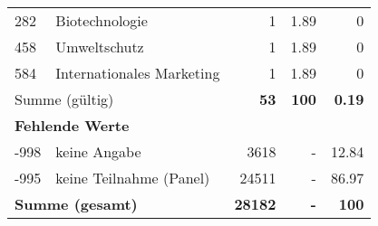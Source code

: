 \begin{longtable}{lXrrr}
        282 & \multicolumn{1}{X}{Biotechnologie} & %
          \num{1} &
          \num[round-mode=places,round-precision=2]{1.89} &
          \num[round-mode=places,round-precision=2]{0} \\

        458 & \multicolumn{1}{X}{Umweltschutz} & %
          \num{1} &
          \num[round-mode=places,round-precision=2]{1.89} &
          \num[round-mode=places,round-precision=2]{0} \\

        584 & \multicolumn{1}{X}{Internationales Marketing} & %
          \num{1} &
          \num[round-mode=places,round-precision=2]{1.89} &
          \num[round-mode=places,round-precision=2]{0} \\

     \midrule
     \multicolumn{2}{l}{Summe (gültig)} &
       \textbf{\num{53}} &
     \textbf{\num{100}} &
       \textbf{\num[round-mode=places,round-precision=2]{0.19}} \\
     \multicolumn{5}{l}{\textbf{Fehlende Werte}}\\
       -998 &
       keine Angabe &
         \num{3618} &
        - &
         \num[round-mode=places,round-precision=2]{12.84} \\
       -995 &
       keine Teilnahme (Panel) &
         \num{24511} &
        - &
         \num[round-mode=places,round-precision=2]{86.97} \\
     \midrule
     \multicolumn{2}{l}{\textbf{Summe (gesamt)}} &
          \textbf{\num{28182}} &
        \textbf{-} &
        \textbf{\num{100}} \\
     \bottomrule
     \end{longtable}
     
